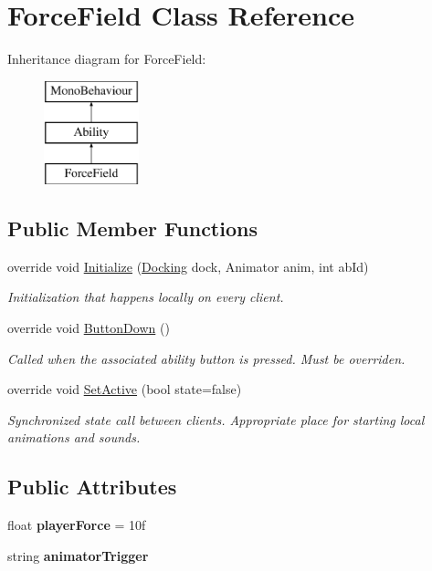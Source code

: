 \hypertarget{class_force_field}{}\section{Force\+Field Class Reference}
\label{class_force_field}
Inheritance diagram for Force\+Field\+:\begin{figure}[H]
\begin{center}
\leavevmode
\includegraphics[height=3.000000cm]{class_force_field}
\end{center}
\end{figure}
\subsection*{Public Member Functions}
\begin{DoxyCompactItemize}
\item 
override void \hyperlink{class_force_field_aed1ced1b7f1ddb9b0a8f0b8322b2eda1}{Initialize} (\hyperlink{class_docking}{Docking} dock, Animator anim, int ab\+Id)
\begin{DoxyCompactList}\small\item\em Initialization that happens locally on every client. \end{DoxyCompactList}\item 
override void \hyperlink{class_force_field_a12dc77bd7d829070d67f182675ff49d1}{Button\+Down} ()
\begin{DoxyCompactList}\small\item\em Called when the associated ability button is pressed. Must be overriden. \end{DoxyCompactList}\item 
override void \hyperlink{class_force_field_a9d2cfa783bc8341a7d7ac6035ab8f587}{Set\+Active} (bool state=false)
\begin{DoxyCompactList}\small\item\em Synchronized state call between clients. Appropriate place for starting local animations and sounds. \end{DoxyCompactList}\end{DoxyCompactItemize}
\subsection*{Public Attributes}
\begin{DoxyCompactItemize}
\item 
\hypertarget{class_force_field_a0efab549884baec0a9d4d1e279edcac6}{}\label{class_force_field_a0efab549884baec0a9d4d1e279edcac6} 
float {\bfseries player\+Force} = 10f
\item 
\hypertarget{class_force_field_a2fdcc66cd476687d9654b27816a63030}{}\label{class_force_field_a2fdcc66cd476687d9654b27816a63030} 
string {\bfseries animator\+Trigger}
\end{DoxyCompactItemize}
